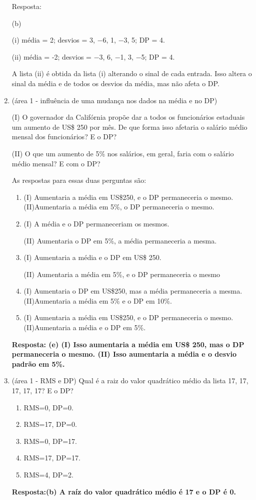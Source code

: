 \documentclass[12pt]{article}\documentclass[brazilian,12pt,a4paper,final]{article}
\begin{document}
\begin{enumerate}
Resposta:

(b)

(i) média = 2; desvios = 3, −6, 1, −3, 5; DP = 4.

(ii) média = -2; desvios = −3, 6, −1, 3, −5; DP = 4.

A lista (ii) é obtida da lista (i) alterando o sinal de cada entrada. Isso
altera o sinal da média e de todos os desvios da média, mas não afeta o DP.

\item (área 1 - influência de uma mudança nos dados na média e no DP)

(I) O governador da Califórnia propõe dar a todos os funcionários estaduais um aumento
de US\$ 250 por mês. De que forma isso afetaria o salário médio mensal dos
funcionários? E o DP?

(II) O que um aumento de 5\% nos salários, em geral, faria com o
salário médio mensal? E com o DP?

As respostas para essas duas perguntas são:

\begin{enumerate}
    \item (I) Aumentaria a média em US\$250, e o DP permaneceria o mesmo.
    (II)Aumentaria a média em 5\%, o DP permaneceria o mesmo.
    \item (I) A média e o DP permaneceriam os mesmos.
    
    (II) Aumentaria o DP em 5\%, a média permaneceria a mesma.
    \item (I) Aumentaria a média e o DP em US\$ 250.
    
    (II) Aumentaria a média em 5\%, e o DP permaneceria o mesmo
    \item (I) Aumentaria o DP em US\$250, mas a média permaneceria a mesma.
    (II)Aumentaria a média em 5\% e o DP em 10\%.
    \item (I) Aumentaria a média em US\$250, e o DP permaneceria o mesmo.
    (II)Aumentaria a média e o DP em 5\%.
\end{enumerate}

\textbf{Resposta: (e)
(I) Isso aumentaria a média em US\$ 250, mas o DP permaneceria o mesmo.
(II) Isso aumentaria a média e o desvio padrão em 5\%.
 }

\item (área 1 - RMS e DP) Qual é a raiz do valor quadrático médio da lista 17, 17, 17, 17, 17? E o DP?

\begin{enumerate}
    \item RMS=0, DP=0.
    \item RMS=17, DP=0.
    \item RMS=0, DP=17.
    \item RMS=17, DP=17.
    \item RMS=4, DP=2.
\end{enumerate}
\textbf{Resposta:(b) A raíz do valor quadrático médio é 17 e o DP é 0.}


\end{enumerate}
\end{document}
